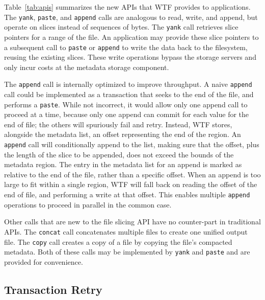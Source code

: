 \documentclass[twocolumn,10pt,letterpaper]{article}
\newcommand{\code}[1]{\texttt{#1}}
\begin{document}
Table~\ref{tab:apis} summarizes the new APIs that WTF provides to applications.
The \code{yank}, \code{paste}, and \code{append} calls are analogous to read,
write, and append, but operate on slices instead of sequences of bytes.  The
\code{yank} call retrieves slice pointers for a range of the file.  An
application may provide these slice pointers to a subsequent call to
\code{paste} or \code{append} to write the data back to the filesystem, reusing
the existing slices.  These write operations bypass the storage servers and only
incur costs at the metadata storage component.

The \code{append} call is internally optimized to improve throughput.  A naive
\code{append} call could be implemented as a transaction that seeks to the end
of the file, and performs a \code{paste}.  While not incorrect, it would allow
only one append call to proceed at a time, because only one append can commit
for each value for the end of file; the others will spuriously fail and retry.
Instead, WTF stores, alongside the metadata list, an offset representing the end
of the region.  An \code{append} call will conditionally append to the list,
making sure that the offset, plus the length of the slice to be appended, does
not exceed the bounds of the metadata region.  The entry in the metadata list
for an append is marked as relative to the end of the file, rather than a
specific offset.  When an append is too large to fit within a single region, WTF
will fall back on reading the offset of the end of file, and performing a write
at that offset.  This enables multiple \code{append} operations to proceed in
parallel in the common case.

Other calls that are new to the file slicing API have no counter-part in
traditional APIs.  The \code{concat} call concatenates multiple files to create
one unified output file.  The \code{copy} call creates a copy of a file by
copying the file's compacted metadata.  Both of these calls may be implemented
by \code{yank} and \code{paste} and are provided for convenience.

\subsection{Transaction Retry}
\end{document}
